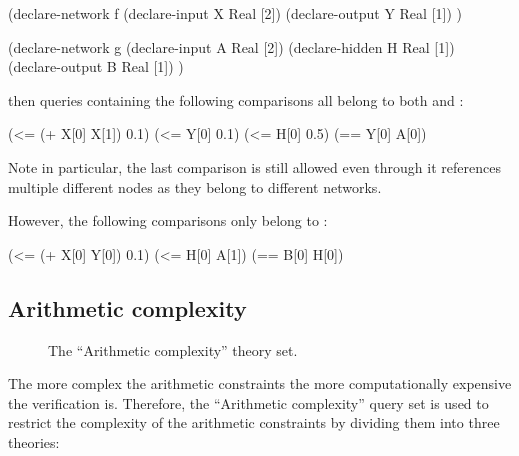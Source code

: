 \begin{code}[style=lbnf]
(declare-network f
    (declare-input  X Real [2])
    (declare-output Y Real [1])
)

(declare-network g
    (declare-input  A Real [2])
    (declare-hidden H Real [1])
    (declare-output B Real [1])
)
\end{code}

\noindent then queries containing the following comparisons all belong to both \snc{} and \mnc{}:

\begin{code}[style=lbnf]
(<= (+ X[0] X[1]) 0.1)
(<= Y[0] 0.1)
(<= H[0] 0.5)
(== Y[0] A[0])
\end{code}

\noindent Note in particular, the last comparison is still allowed even through it references multiple different nodes as they belong to different networks. 

However, the following comparisons only belong to \mnc{}:

\begin{code}[style=lbnf]
(<= (+ X[0] Y[0]) 0.1)
(<= H[0] A[1])
(== B[0] H[0])
\end{code}

\subsection{Arithmetic complexity}
\label{sec:arithmetic_complexity}

\begin{figure}[h]
\centering
{}
\caption{The ``Arithmetic complexity'' theory set.}
\label{fig:arithmetic-complexities}
\end{figure}

The more complex the arithmetic constraints the more computationally expensive the verification is. Therefore, the ``Arithmetic complexity'' query set is used to restrict the complexity of the arithmetic constraints by dividing them into three theories:

